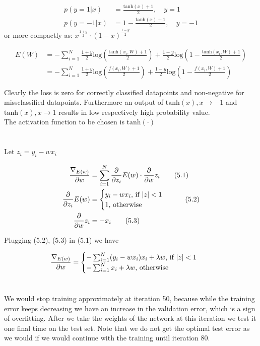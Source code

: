 \documentclass[11pt]{article}
\newcommand{\exercise}{\section{}}
\newcommand{\sumf}[3]{\sum_{#1}^{#2} #3}
\newcommand{\ifelse}[4]{%
\begingroup
\begin{cases}
  {#1} \text{, if {#2}} \\
  {#3} \text{, otherwise {#4}}
\end{cases}
\endgroup
}
\newcommand{\gradf}[2]{\frac{\nabla_{#1}}{{\partial #2}}}
\newcommand{\partialf}[1]{\frac{\partial}{{\partial #1}}}
\begin{document}
\begin{align*}
p( y = 1 | x) &=\frac{\text{tanh}(x) + 1}{2}, \quad y = 1 \\
p( y = -1 | x) &=1 - \frac{\text{tanh}(x) + 1}{2}, \quad y = -1
\end{align*}
or more compactly as:
$x^{\frac{1 + y}{2}} \cdot (1 - x)^{\frac{1 - y}{2}}$

\begin{align*}
E(W) &= -\sumf{i = 1}{N}{ \frac{1 + y}{2} \text{log}(\frac{\text{tanh}(x_i, W) + 1}{2}) + \frac{1 - y}{2} \text{log}(1 - \frac{\text{tanh}(x_i, W) + 1}{2})} \\
&= -\sumf{i = 1}{N}{ \frac{1 + y}{2} \text{log}(\frac{f(x_i, W) + 1}{2}) + \frac{1 - y}{2} \text{log}(1 - \frac{f(x_i, W) + 1}{2})}
\end{align*}

\noindent Clearly the loss is zero for correctly classified datapoints and non-negative for missclassified datapoints. Furthermore an output of $\text{tanh}(x), x \rightarrow -1$ and  $\text{tanh}(x), x \rightarrow 1$ results in low respectively high probability value. 
\\
The activation function to be chosen is $\text{tanh}(\cdot)$

\exercise

Let $z_i = y_i - w x_i$

\begin{align*}
\gradf{E(w)}{w} &= \sumf{i=1}{N}{\partialf{z_i}E(w) \cdot \partialf{w}z_i} \tag{5.1} \\
\partialf{z_i}E(w) &= \ifelse{y_i - w x_i}{$\vert z \vert < 1$}{1}{} \tag{5.2} \\
\partialf{w}z_i &= -x_i \tag{5.3}
\end{align*}

\noindent Plugging (5.2), (5.3) in (5.1) we have

\begin{align*}
\gradf{E(w)}{w} &= \ifelse{-\sumf{i=1}{N}{ (y_i - w x_i) x_i} + \lambda w}{$\vert z \vert < 1$}{-\sumf{i=1}{N}{x_i} + \lambda w}{}
\end{align*}

\exercise

\noindent We would stop training approximately at iteration 50, because while the training error keeps decreasing we have an increase in the validation error, which is a sign of overfitting. After we take the weights of the network at this iteration we test it one final time on the test set. Note that we do not get the optimal test error as we would if we would continue with the training until iteration 80.
\end{document}
